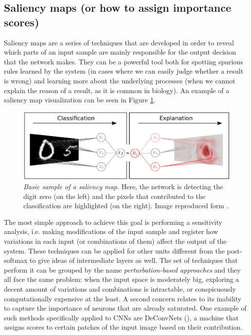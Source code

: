 	
	\subsection{Saliency maps (or how to assign importance scores)}
	
	Saliency maps are a series of techniques that are developed in order to reveal which parts of an input sample are mainly responsible for the output decision that the network makes. They can be a powerful tool both for spotting spurious rules learned by the system (in cases where we can easily judge whether a result is wrong) and learning more about the underlying processes (when we cannot explain the reason of a result, as it is common in biology). An example of a saliency map visualization can be seen in Figure \ref{fig:deeptaylor}.
	
	\begin{figure}
	\centering
	\includegraphics[width=0.7\linewidth]{Figures/deeptaylor}
	\caption{\textit{Basic sample of a saliency map.} Here, the network is detecting the digit zero (on the left) and the pixels that contributed to the classification are highlighted (on the right). Image reproduced form \cite{Montavon2017}.}
	\label{fig:deeptaylor}
	\end{figure}

	
	The most simple approach to achieve this goal is performing a sensitivity analysis, i.e. making modifications of the input sample and register how variations in each input (or combinations of them) affect the output of the system. These techniques can be applied for other units different from the post-softmax to give ideas of intermediate layers as well. The set of techniques that perform it can be grouped by the name \textit{perturbation-based approaches} and they all face the same problem: when the input space is moderately big, exploring a decent amount of variations and combinations is intractable, or conspicuously computationally expensive at the least. A second concern relates to its inability to capture the importance of neurons that are already saturated. One example of such methods specifically applied to CNNs are DeConvNets (\cite{Zeiler2014}), a machine that assigns scores to certain patches of the input image based on their contribution.
	
